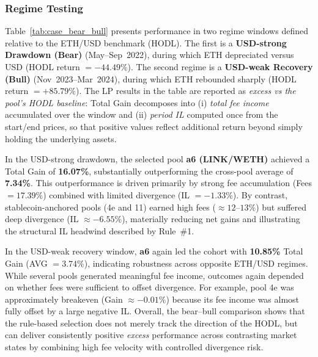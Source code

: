 \documentclass[journal]{IEEEtran}
\begin{document}
\subsubsection{Regime Testing}
Table~\ref{tab:case_bear_bull} presents performance in two regime windows defined relative to the ETH/USD benchmark (HODL). The first is a  \textbf{USD-strong Drawdown (Bear)} (May--Sep~2022), during which ETH depreciated versus USD (HODL return $=-44.49\%$). The second regime is a \textbf{USD-weak Recovery (Bull)} (Nov~2023--Mar~2024), during which ETH rebounded sharply (HODL return $=+85.79\%$). The LP results in the table are reported as \emph{excess vs the pool’s HODL baseline}: Total Gain decomposes into (i) \emph{total fee income} accumulated over the window and (ii) \emph{period IL} computed once from the start/end prices, so that positive values reflect additional return beyond simply holding the underlying assets.

In the USD-strong drawdown, the selected pool \textbf{a6 (LINK/WETH)} achieved a Total Gain of \textbf{16.07\%}, substantially outperforming the cross-pool average of \textbf{7.34\%}. This outperformance is driven primarily by strong fee accumulation (Fees $=17.39\%$) combined with limited divergence (IL $=-1.33\%$). By contrast, stablecoin-anchored pools (4e and 11) earned high fees ($\approx 12\text{--}13\%$) but suffered deep divergence (IL $\approx -6.55\%$), materially reducing net gains and illustrating the structural IL headwind described by Rule~\#1.

In the USD-weak recovery window, \textbf{a6} again led the cohort with \textbf{10.85\%} Total Gain (AVG $=3.74\%$), indicating robustness across opposite ETH/USD regimes. While several pools generated meaningful fee income, outcomes again depended on whether fees were sufficient to offset divergence. For example, pool 4e was approximately breakeven (Gain $\approx -0.01\%$) because its fee income was almost fully offset by a large negative IL. Overall, the bear--bull comparison shows that the rule-based selection does not merely track the direction of the HODL, but can deliver consistently positive \emph{excess} performance across contrasting market states by combining high fee velocity with controlled divergence risk.
\end{document}

